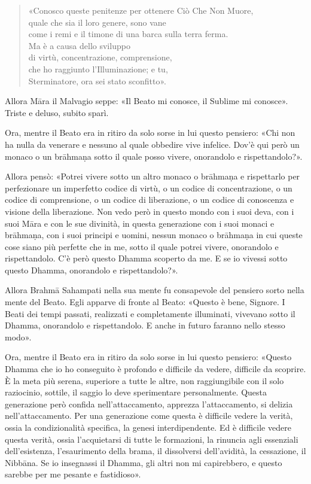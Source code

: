 \begin{quote}
«Conosco queste penitenze per ottenere Ciò Che Non Muore, \\
quale che sia il loro genere, sono vane \\
come i remi e il timone di una barca sulla terra ferma. \\
Ma è a causa dello sviluppo \\
di virtù, concentrazione, comprensione, \\
che ho raggiunto l’Illuminazione; e tu, \\
Sterminatore, ora sei stato sconfitto».
\end{quote}

Allora Māra il Malvagio seppe: «Il Beato mi conosce, il Sublime mi conosce».
Triste e deluso, subito sparì.


Ora, mentre il Beato era in ritiro da solo sorse in lui questo pensiero: «Chi
non ha nulla da venerare e nessuno al quale obbedire vive infelice. Dov’è qui
però un monaco o un brāhmaṇa sotto il quale posso vivere, onorandolo e
rispettandolo?».

Allora pensò: «Potrei vivere sotto un altro monaco o brāhmaṇa e rispettarlo per
perfezionare un imperfetto codice di virtù, o un codice di concentrazione, o un
codice di comprensione, o un codice di liberazione, o un codice di conoscenza e
visione della liberazione. Non vedo però in questo mondo con i suoi deva, con i
suoi Māra e con le sue divinità, in questa generazione con i suoi monaci e
brāhmaṇa, con i suoi principi e uomini, nessun monaco o brāhmaṇa in cui queste
cose siano più perfette che in me, sotto il quale potrei vivere, onorandolo e
rispettandolo. C’è però questo Dhamma scoperto da me. E se io vivessi sotto
questo Dhamma, onorandolo e rispettandolo?».

Allora Brahmā Sahampati nella sua mente fu consapevole del pensiero sorto nella
mente del Beato. Egli apparve di fronte al Beato: «Questo è bene, Signore. I
Beati dei tempi passati, realizzati e completamente illuminati, vivevano sotto
il Dhamma, onorandolo e rispettandolo. E anche in futuro faranno nello stesso
modo».


 Ora, mentre il Beato era in ritiro da solo sorse in lui
questo pensiero: «Questo Dhamma che io ho conseguito è profondo e difficile da
vedere, difficile da scoprire. È la meta più serena, superiore a tutte le altre,
non raggiungibile con il solo raziocinio, sottile, il saggio lo deve
sperimentare personalmente. Questa generazione però confida nell’attaccamento,
apprezza l’attaccamento, si delizia nell’attaccamento. Per una generazione come
questa è difficile vedere la verità, ossia la condizionalità specifica, la
genesi interdipendente. Ed è difficile vedere questa verità, ossia l’acquietarsi
di tutte le formazioni, la rinuncia agli essenziali dell’esistenza,
l’esaurimento della brama, il dissolversi dell’avidità, la cessazione, il
Nibbāna. Se io insegnassi il Dhamma, gli altri non mi capirebbero, e questo
sarebbe per me pesante e fastidioso».

